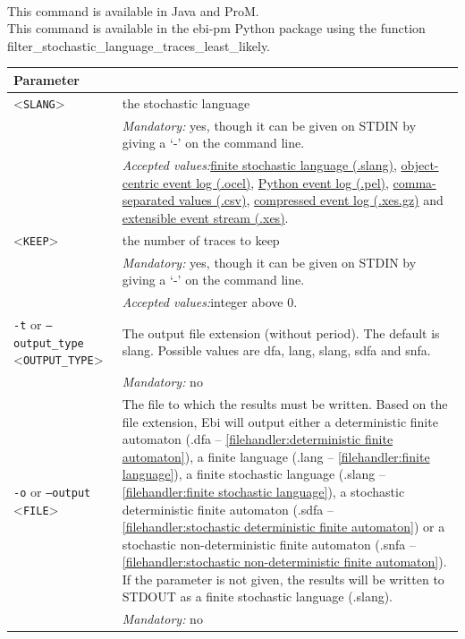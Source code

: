 {\\This command is available in Java and ProM.
\\This command is available in the ebi-pm Python package using the function filter\_stochastic\_language\_traces\_least\_likely.
\begin{tabularx}{\linewidth}{lX}
\toprule
Parameter \\\midrule
<\texttt{SLANG}>&the stochastic language\\
&\textit{Mandatory:} \quad yes, though it can be given on STDIN by giving a `-' on the command line.\\
&\textit{Accepted values:}\quad \hyperref[filehandler:finite stochastic language]{finite stochastic language (.slang)}, \hyperref[filehandler:object-centric event log]{object-centric event log (.ocel)}, \hyperref[filehandler:Python event log]{Python event log (.pel)}, \hyperref[filehandler:comma-separated values]{comma-separated values (.csv)}, \hyperref[filehandler:compressed event log]{compressed event log (.xes.gz)} and \hyperref[filehandler:extensible event stream]{extensible event stream (.xes)}.\\
<\texttt{KEEP}>&the number of traces to keep\\
&\textit{Mandatory:} \quad yes, though it can be given on STDIN by giving a `-' on the command line.\\
&\textit{Accepted values:}\quad integer above 0.\\
\texttt{-t} or \texttt{--output\_type} <\texttt{OUTPUT\_TYPE}> &
The output file extension (without period). The default is slang. Possible values are dfa, lang, slang, sdfa and snfa.\\
&\textit{Mandatory:} \quad no\\
\texttt{-o} or \texttt{--output} <\texttt{FILE}> &
The file to which the results must be written. Based on the file extension, Ebi will output either a deterministic finite automaton (.dfa -- \cref{filehandler:deterministic finite automaton}), a finite language (.lang -- \cref{filehandler:finite language}), a finite stochastic language (.slang -- \cref{filehandler:finite stochastic language}), a stochastic deterministic finite automaton (.sdfa -- \cref{filehandler:stochastic deterministic finite automaton}) or a stochastic non-deterministic finite automaton (.snfa -- \cref{filehandler:stochastic non-deterministic finite automaton}).
If the parameter is not given, the results will be written to STDOUT as a finite stochastic language (.slang).\\
&\textit{Mandatory:} \quad no\\

\end{tabularx}}
